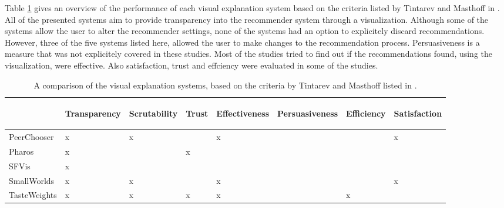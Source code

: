 Table \ref{table:comparison:criteria} gives an overview of the performance of each visual explanation system based on the criteria listed by Tintarev and Masthoff in \cite{tintarev:2007:SER:1547550.1547664}. All of the presented systems aim to provide transparency into the recommender system through a visualization. Although some of the systems allow the user to alter the recommender settings, none of the systems had an option to explicitely discard recommendations. However, three of the five systems listed here, allowed the user to make changes to the recommendation process. Persuasiveness is a measure that was not explicitely covered in these studies. Most of the studies tried to find out if the recommendations found, using the visualization, were effective. Also satisfaction, trust and effciency were evaluated in some of the studies.

\begin{center}
	\begin{table}%
	\caption{A comparison of the visual explanation systems, based on the criteria by Tintarev and Masthoff listed in \cite{tintarev:2007:SER:1547550.1547664}.}
		\begin{center}
			\begin{tabular}{l | l l l l l l l }
				\hline
											&	\begin{sideways}Transparency\end{sideways} 
											& \begin{sideways}Scrutability\end{sideways} 
											& \begin{sideways}Trust\end{sideways} 
											& \begin{sideways}Effectiveness\end{sideways} 
											& \begin{sideways}Persuasiveness\end{sideways} 
											& \begin{sideways}Efficiency\end{sideways} 
											& \begin{sideways}Satisfaction\end{sideways}  \\
				\hline
				PeerChooser		&	x &	x	&		&	x	& 	& 	& x	\\
				Pharos				&	x	&		&	x	&		& 	& 	&  	\\
				SFVis					&	x &		&		&		& 	& 	&  	\\
				SmallWorlds		&	x	&	x	&		&	x	& 	& 	& x	\\
				TasteWeights	&	x &	x	&	x	&	x	& 	& x	&  	\\
				\hline
			\end{tabular}
		\end{center}
		
		\label{table:comparison:criteria}
	\end{table}
\end{center}





